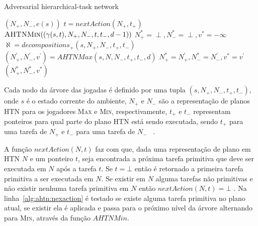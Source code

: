 \begin{algorithm}
	\caption{Adversarial hierarchical-task network}
	\label{alg:ahtn}
	\begin{algorithmic}[1]		
		\label{alg:lin:firstLine}
		\State	\Return $(N_{+}, N_{-}, e(s))$
		\EndIf
		 \label{alg:ahtn:nexaction}
		\State $t = nextAction(N_{+}, t_{+})$ 
		\State \Return $\Call{AHTNMin}{(\gamma(s,t), N_{+}, N_{-}, t, t_{-}, d-1)}$ \label{alg:ahtn:troca}
		\EndIf
		\State $N_{+}^{*} = \perp, N_{-}^{*} = \perp, v^{*} = -\infty$
		\State $\aleph = decompositions_{+}(s, N_{+}, N_{-}, t_{+}, t_{-})$ \label{alg:decompositions}
		 \label{alg:ahtn:for}
		\State $(N^{'}_{+}, N^{'}_{-}, v^{'}) = AHTNMax(s, N, N_{-}, t_{+}, t_{-}, d)$
		\State $N_{+}^{*} = N^{'}_{+}, N_{-}^{*} = N^{'}_{-}, v^{*} = v^{'} $
		\EndIf
		\EndFor		
		\State \Return $(N_{+}^{*}, N_{-}^{*}, v^{*} )$
		\EndFunction
	\end{algorithmic}
\end{algorithm}


Cada nodo da árvore das jogadas é definido por uma tupla $(s, N_{+}, N_{-}, t_{+}, t_{-})$, onde $s$ é o estado corrente do ambiente, $N_{+}$ e $N_{-}$ são a representação de planos HTN para os jogadores \textsc{Max} e \textsc{Min}, respectivamente, $t_{+}$ e $t_{-}$ representam ponteiros para qual parte do plano HTN está sendo executada, sendo $t_{+}$ para uma tarefa de $N_{+}$ e $t_{-}$ para uma tarefa de $N_{-}$ ~\cite{ontanon2015adversarial}. 

A função $nextAction(N,t)$ faz com que, dada uma representação de plano em HTN $N$ e um ponteiro $t$, seja encontrada a próxima tarefa primitiva que deve ser executada em $N$ após a tarefa $t$.  
Se $t = \bot$ então é retornado a primeira tarefa primitiva a ser executada em $N$. 
Se existir em $N$ alguma tarefas não primitivas e não existir nenhuma tarefa primitiva em $N$ então $nextAction(N,t) = \bot$ \cite{ontanon2015adversarial}.
Na linha~\ref{alg:ahtn:nexaction} é testado se existe alguma tarefa primitiva no plano atual, se existir ela é aplicada e passa para o próximo nível da árvore alternando para \textsc{Min}, através da função $AHTNMin$. 

